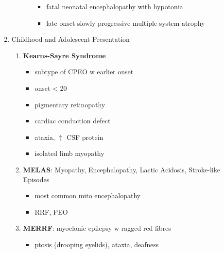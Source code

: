\documentclass{scrartcl}
\begin{document}
\begin{enumerate}
\begin{enumerate}
\begin{itemize}
\begin{itemize}
\item fatal neonatal encephalopathy with hypotonia
\item late-onset slowly progressive multiple-system atrophy
\end{itemize}
\end{itemize}
\end{enumerate}
\item Childhood and Adolescent Presentation
\label{sec:org3129b2e}
\begin{enumerate}
\item \textbf{Kearns-Sayre Syndrome}
\label{sec:orgf6eb275}
\begin{itemize}
\item subtype of CPEO w earlier onset
\item onset \textless{} 20
\item pigmentary retinopathy
\item cardiac conduction defect
\item ataxia, \(\uparrow\) CSF protein
\item isolated limb myopathy
\end{itemize}
\item \textbf{MELAS}: Myopathy, Encephalopathy, Lactic Acidosis, Stroke-like Episodes
\label{sec:orgefefd2a}
\begin{itemize}
\item most common mito encephalopathy
\item RRF, PEO
\end{itemize}
\item \textbf{MERRF}: myoclonic epilepsy w ragged red fibres
\label{sec:orge6f592a}
\begin{itemize}
\item ptosis (drooping eyelids), ataxia, deafness
\begin{description}

\end{description}
\end{itemize}
\end{enumerate}
\end{enumerate}
\end{document}

